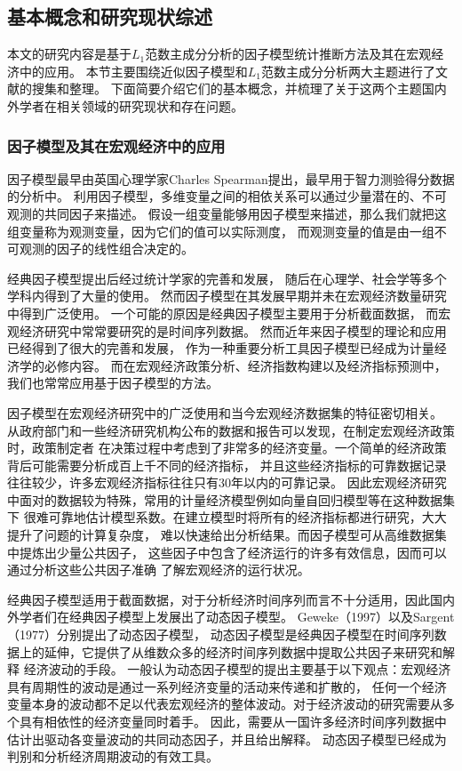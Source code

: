 \subsection{基本概念和研究现状综述}
本文的研究内容是基于$L_1$范数主成分分析的因子模型统计推断方法及其在宏观经济中的应用。
本节主要围绕近似因子模型和$L_1$范数主成分分析两大主题进行了文献的搜集和整理。
下面简要介绍它们的基本概念，并梳理了关于这两个主题国内外学者在相关领域的研究现状和存在问题。

\subsubsection{因子模型及其在宏观经济中的应用}
因子模型最早由英国心理学家Charles Spearman提出，最早用于智力测验得分数据的分析中。
利用因子模型，多维变量之间的相依关系可以通过少量潜在的、不可观测的共同因子来描述。
假设一组变量能够用因子模型来描述，那么我们就把这组变量称为观测变量，因为它们的值可以实际测度，
而观测变量的值是由一组不可观测的因子的线性组合决定的。

经典因子模型提出后经过统计学家的完善和发展，
随后在心理学、社会学等多个学科内得到了大量的使用\cite{bartholomew1995spearman}。
然而因子模型在其发展早期并未在宏观经济数量研究中得到广泛使用。
一个可能的原因是经典因子模型主要用于分析截面数据，
而宏观经济研究中常常要研究的是时间序列数据。
然而近年来因子模型的理论和应用已经得到了很大的完善和发展，
作为一种重要分析工具因子模型已经成为计量经济学的必修内容。
而在宏观经济政策分析、经济指数构建以及经济指标预测中，我们也常常应用基于因子模型的方法。

因子模型在宏观经济研究中的广泛使用和当今宏观经济数据集的特征密切相关。
从政府部门和一些经济研究机构公布的数据和报告可以发现，在制定宏观经济政策时，政策制定者
在决策过程中考虑到了非常多的经济变量。一个简单的经济政策背后可能需要分析成百上千不同的经济指标，
并且这些经济指标的可靠数据记录往往较少，许多宏观经济指标往往只有30年以内的可靠记录。
因此宏观经济研究中面对的数据较为特殊，常用的计量经济模型例如向量自回归模型等在这种数据集下
很难可靠地估计模型系数。在建立模型时将所有的经济指标都进行研究，大大提升了问题的计算复杂度，
难以快速给出分析结果。而因子模型可从高维数据集中提炼出少量公共因子，
这些因子中包含了经济运行的许多有效信息，因而可以通过分析这些公共因子准确
了解宏观经济的运行状况。

经典因子模型适用于截面数据，对于分析经济时间序列而言不十分适用，因此国内外学者们在经典因子模型上发展出了动态因子模型。
Geweke（1997）\cite{geweke1977dynamic}以及Sargent（1977）\cite{sargent1977business}分别提出了动态因子模型，
动态因子模型是经典因子模型在时间序列数据上的延伸，它提供了从维数众多的经济时间序列数据中提取公共因子来研究和解释
经济波动的手段。
一般认为动态因子模型的提出主要基于以下观点：宏观经济具有周期性的波动是通过一系列经济变量的活动来传递和扩散的，
任何一个经济变量本身的波动都不足以代表宏观经济的整体波动。对于经济波动的研究需要从多个具有相依性的经济变量同时着手。
因此，需要从一国许多经济时间序列数据中估计出驱动各变量波动的共同动态因子，并且给出解释。
动态因子模型已经成为判别和分析经济周期波动的有效工具。

